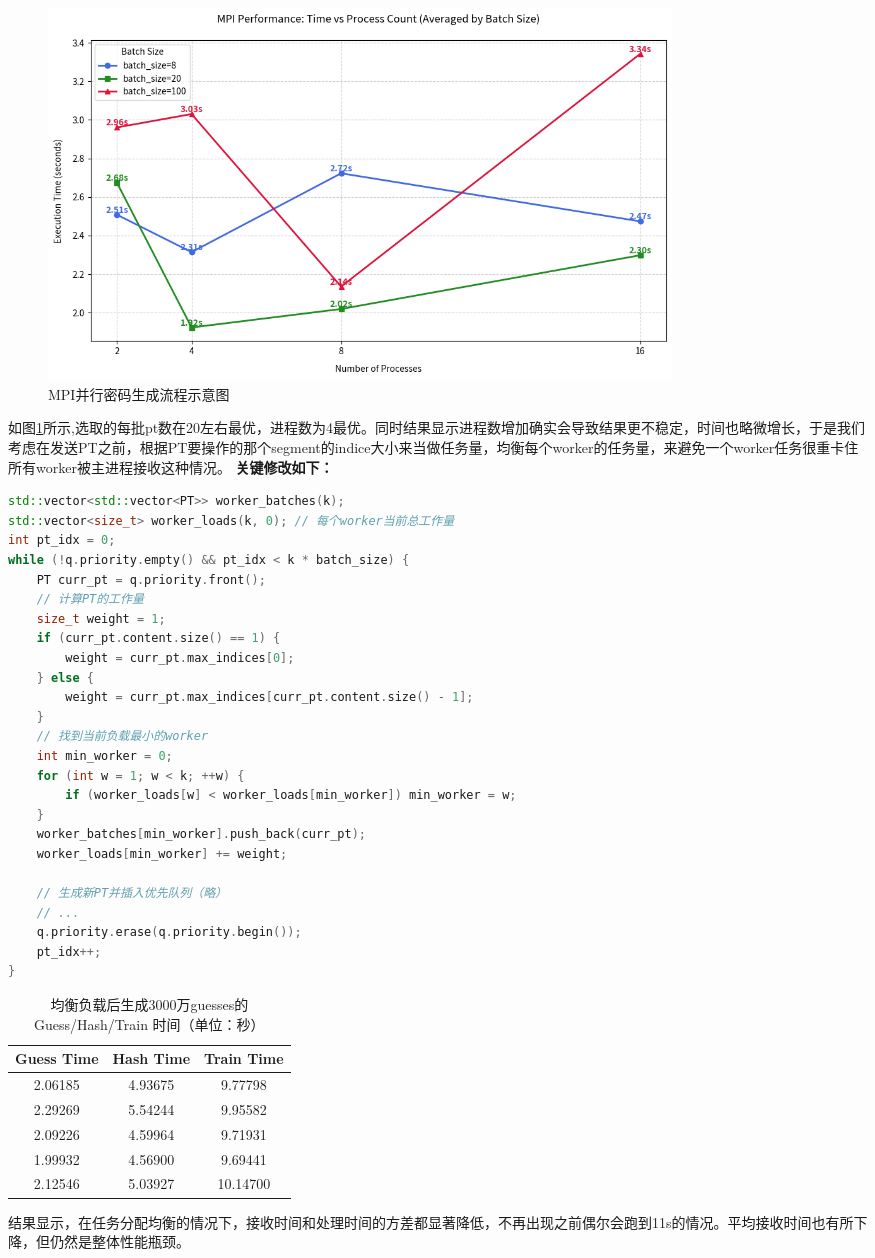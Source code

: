 \documentclass[a4paper]{article}
\begin{document}
\begin{figure}[H] %
    \centering
    \includegraphics[width=0.8\textwidth]{table1.png}
    \caption{MPI并行密码生成流程示意图}
    \label{fig:test1}
\end{figure}

\par 如图\ref{fig:test1}所示,选取的每批pt数在20左右最优，进程数为4最优。同时结果显示进程数增加确实会导致结果更不稳定，时间也略微增长，于是我们考虑在发送PT之前，根据PT要操作的那个segment的indice大小来当做任务量，均衡每个worker的任务量，来避免一个worker任务很重卡住所有worker被主进程接收这种情况。
\textbf{关键修改如下：}
\begin{lstlisting}[language=C++,caption={基于工作量的PT负载均衡分配}]
std::vector<std::vector<PT>> worker_batches(k);
std::vector<size_t> worker_loads(k, 0); // 每个worker当前总工作量
int pt_idx = 0;
while (!q.priority.empty() && pt_idx < k * batch_size) {
    PT curr_pt = q.priority.front();
    // 计算PT的工作量
    size_t weight = 1;
    if (curr_pt.content.size() == 1) {
        weight = curr_pt.max_indices[0];
    } else {
        weight = curr_pt.max_indices[curr_pt.content.size() - 1];
    }
    // 找到当前负载最小的worker
    int min_worker = 0;
    for (int w = 1; w < k; ++w) {
        if (worker_loads[w] < worker_loads[min_worker]) min_worker = w;
    }
    worker_batches[min_worker].push_back(curr_pt);
    worker_loads[min_worker] += weight;

    // 生成新PT并插入优先队列（略）
    // ...
    q.priority.erase(q.priority.begin());
    pt_idx++;
}
\end{lstlisting}
\begin{table}[H]
\centering
\caption{均衡负载后生成3000万guesses的 Guess/Hash/Train 时间（单位：秒）}
\begin{tabular}{ccc}
\toprule
Guess Time & Hash Time & Train Time \\
\midrule
2.06185 & 4.93675 & 9.77798 \\
2.29269 & 5.54244 & 9.95582 \\
2.09226 & 4.59964 & 9.71931 \\
1.99932 & 4.56900 & 9.69441 \\
2.12546 & 5.03927 & 10.14700 \\
\bottomrule
\end{tabular}
\end{table}
\par 结果显示，在任务分配均衡的情况下，接收时间和处理时间的方差都显著降低，不再出现之前偶尔会跑到11s的情况。平均接收时间也有所下降，但仍然是整体性能瓶颈。
\end{document}
